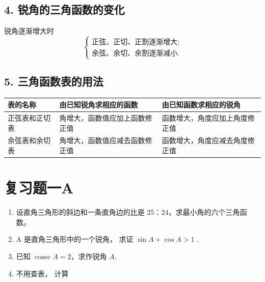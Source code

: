 \subsection{4. 锐角的三角函数的变化}

锐角逐渐增大时
\[
\left\{
\begin{array}{l}
\text{正弦、正切、正割逐渐增大}; \\
\text{余弦、余切、余割逐渐减小}.
\end{array}
\right.
\]

\subsection{5. 三角函数表的用法}

{\def\LTcaptype{none} %
\begin{longtable}[]{@{}
  >{\raggedright\arraybackslash}p{}
  >{\raggedright\arraybackslash}p{}
  >{\raggedright\arraybackslash}p{}@{}}
\toprule\noalign{}
\begin{minipage}[b]{\linewidth}\raggedright
表的名称
\end{minipage} & \begin{minipage}[b]{\linewidth}\raggedright
由已知锐角求相应的函数
\end{minipage} & \begin{minipage}[b]{\linewidth}\raggedright
由已知函数求相应的锐角
\end{minipage} \\
\midrule\noalign{}
\endhead
\bottomrule\noalign{}
\endlastfoot
正弦表和正切表 & 角增大，函数值应加上函数修正值 &
函数增大，角度应加上角度修正值 \\
余弦表和余切表 & 角增大，函数值应减去函数修正值 &
函数增大，角度应减去角度修正值 \\
\end{longtable}
}

\section{复习题一A}

\begin{enumerate}
\item
  设直角三角形的斜边和一条直角边的比是 25：24，求最小角的六个三角函数。
\item
  A 是直角三角形中的一个锐角， 求证 \(\sin A + \cos A > 1\) .
\item
  已知 \(\operatorname{cosec} A = 2\)，求作锐角 \(A\).
\item
  不用查表， 计算
\end{enumerate}

